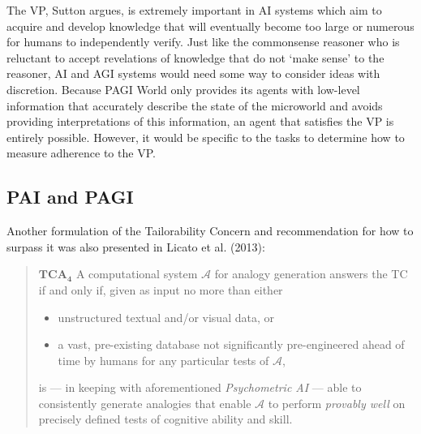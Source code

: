 The VP, Sutton argues, is extremely important in AI systems which aim to acquire and develop knowledge that will eventually become too large or numerous for humans to independently verify. Just like the commonsense reasoner who is reluctant to accept revelations of knowledge that do not `make sense' to the reasoner, AI and AGI systems would need some way to consider ideas with discretion. Because PAGI World only provides its agents with low-level information that accurately describe the state of the microworld and avoids providing interpretations of this information, an agent that satisfies the VP is entirely possible. However, it would be specific to the tasks to determine how to measure adherence to the VP.

\subsection{PAI and PAGI}

Another formulation of the Tailorability Concern and recommendation for how to surpass it was also presented in Licato et al. (2013):

\begin{small}
 \begin{quote}
\begin{mdframed}[backgroundcolor=gray!15]
  $\mathbf{TCA_4}$ A computational system $\mathcal A$ for analogy
  generation answers the TC if and only if, given as input no more
  than either
   \begin{itemize}
    \item unstructured textual and/or visual data, or 
    \item a vast, pre-existing database not significantly
      pre-engineered ahead of time by humans for any particular tests
      of $\mathcal A$,
   \end{itemize}
  is --- in keeping with aforementioned \textit{Psychometric AI} ---
  able to consistently generate analogies that enable $\mathcal A$ to
  perform \emph{provably well} on precisely defined tests of cognitive
  ability and skill.
\end{mdframed}
 \end{quote}
\end{small}

